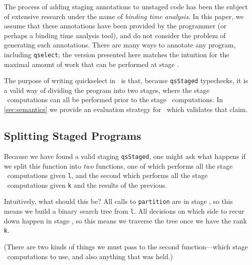 The process of adding staging annotations to unstaged code has been the subject
of extensive research under the name of \emph{binding time analysis}. In this
paper, we assume that these annotations have been provided by the programmer (or
perhaps a binding time analysis tool), and do not consider the problem of
generating such annotations. There are many ways to annotate any program,
including \texttt{qselect}; the version presented here matches the intuition for
the maximal amount of work that can be performed at stage \bbone.

The purpose of writing quickselect in \lang\ is that, because \texttt{qsStaged}
typechecks, it is a valid way of dividing the program into two stages, where the
stage \bbone\ computations can all be performed prior to the stage \bbtwo\
computations. In \ref{sec:semantics} we provide an evaluation strategy for
\lang\ which validates that claim.



\subsection{Splitting Staged Programs}



Because we have found a valid staging \texttt{qsStaged}, one might ask what
happens if we split this function into \emph{two} functions, one of which
performs all the stage \bbone\ computations given \texttt{l}, and the second
which performs all the stage \bbtwo\ computations given \texttt{k} and the
results of the previous.

Intuitively, what should this be? All calls to \texttt{partition} are in stage
\bbone, so this means we build a binary search tree from \texttt{l}. All
decisions on which side to recur down happen in stage \bbtwo, so this means we
traverse the tree once we have the rank \texttt{k}.

(There are two kinds of things we must pass to the second function---which stage
\bbtwo\ computations to use, and also anything that was held.)


